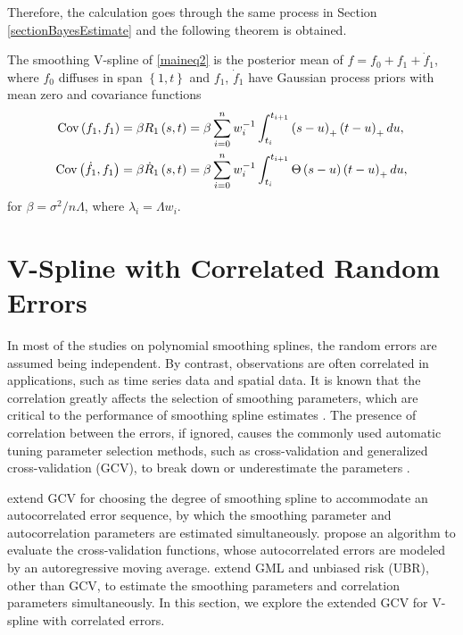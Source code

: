 Therefore, the calculation goes through the same process in Section \ref{sectionBayesEstimate} and the following theorem is obtained. 
\begin{theorem}
The smoothing V-spline of \eqref{maineq2} is the posterior mean of $f=f_0+f_1 + \dot{f}_1$, where $f_0$ diffuses in span $\left\lbrace 1,t\right\rbrace$ and $f_1$, $\dot{f}_1$ have Gaussian process priors with mean zero and covariance functions
\begin{align}
\mathrm{Cov} \left(f_1,f_1\right)   &= \beta R_1\left(s,t\right)  =\beta \sum_{i=0}^n w_i^{-1} \int_{t_i}^{t_{i+1}} \left(s-u\right)_+\left(t-u\right)_+du, \\
\mathrm{Cov} \left(\dot{f}_1,f_1\right)  &= \beta \dot{R}_1\left(s,t\right) =\beta \sum_{i=0}^n w_i^{-1} \int_{t_i}^{t_{i+1}} \Theta\left(s-u\right)\left(t-u\right)_+du,
\end{align}
for $\beta = \sigma^2/n\Lambda$, where $\lambda_i=\Lambda w_i$.
\end{theorem}



\section{V-Spline with Correlated Random Errors}


In most of the studies on polynomial smoothing splines, the random errors are assumed being independent. By contrast,  observations are often correlated in applications, such as time series data and spatial data. It is known that the correlation greatly affects the selection of smoothing parameters, which are critical to the performance of smoothing spline estimates \citep{wang1998smoothing}. The presence of correlation
between the errors, if ignored, causes the commonly used automatic tuning parameter selection methods, such as cross-validation and generalized cross-validation (GCV), to break down or underestimate the parameters \citep{opsomer2001nonparametric}. 


\cite{diggle1989spline} extend GCV for choosing the degree of smoothing spline to accommodate an autocorrelated error sequence, by which the smoothing parameter and autocorrelation parameters are estimated simultaneously.  \cite{kohn1992nonparametric} propose an algorithm to evaluate the cross-validation functions, whose autocorrelated errors are modeled by an autoregressive moving average. \cite{wang1998smoothing} extend GML and unbiased risk (UBR), other than GCV, to estimate the smoothing parameters and correlation parameters simultaneously. In this section, we explore the extended GCV for V-spline with correlated errors. 



